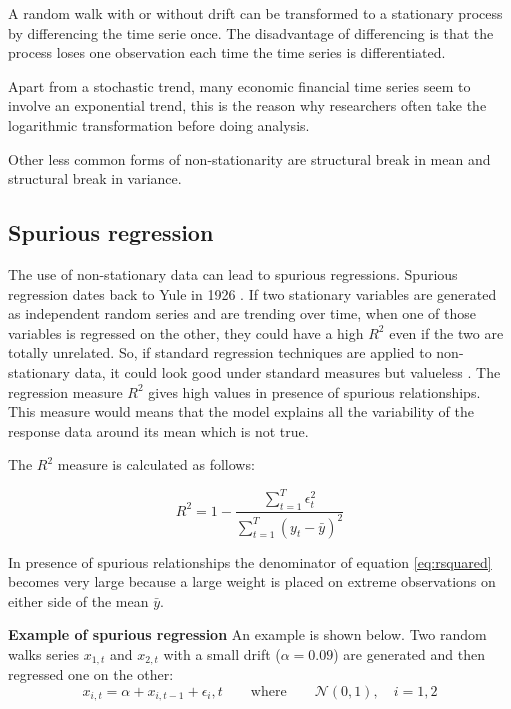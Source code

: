 \begin{enumerate}[(a)]
A random walk with or without drift can be transformed to a stationary process by differencing the time serie once. The disadvantage of differencing is that the process loses one observation each time the time series is differentiated.

Apart from a stochastic trend, many economic financial time series seem to involve an exponential trend, this is the reason why researchers often take the logarithmic transformation before doing analysis.

Other less common forms of non-stationarity are structural break in mean and structural break in variance. 
\end{enumerate}

\subsection{Spurious regression} \label{sec:spurious}
The use of non-stationary data can lead to spurious regressions. Spurious
regression dates back to Yule in 1926 \cite{yule1926}. If two stationary
variables are generated as independent random series and are trending over
time, when one of those variables is regressed on the other, they could have a
high $R^2$ even if the two are totally unrelated. So, if standard regression
techniques are applied to non-stationary data, it could look good under
standard measures but valueless \cite{brooks2002}.
The
regression measure $R^2$ gives high values in presence of spurious
relationships. This measure would means that the model explains all the
variability of the response data around its mean which is not true. 

The $R^2$ measure is calculated as follows:

\begin{equation}
\label{eq:rsquared}
R^2 = 1 - \frac{\sum_{t=1}^T \epsilon_t^2}{\sum_{t=1}^T(y_t - \bar{y})^2}
\end{equation}

In presence of spurious relationships the denominator of equation
\ref{eq:rsquared} becomes very large because a large weight is placed on
extreme observations on either side of the mean $\bar{y}$.

\textbf{Example of spurious regression} \quad 
An example is shown below. Two random walks series $x_{1,t}$ and $x_{2,t}$ with
a small drift ($\alpha=0.09$) are generated and then regressed one on the
other:
 \begin{equation}
 x_{i,t} = \alpha + x_{i,t-1} + \epsilon_i,t  \qquad \text{where} \qquad
\mathcal{N}(0,1), \quad i=1,2
 \end{equation}

